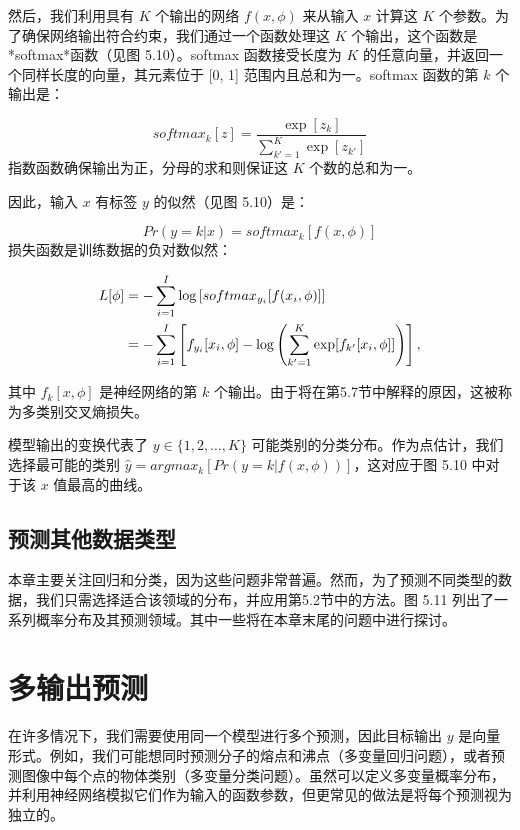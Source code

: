 然后，我们利用具有 \(K\) 个输出的网络 \(f(x, \phi)\) 来从输入 \(x\) 计算这 \(K\) 个参数。为了确保网络输出符合约束，我们通过一个函数处理这 \(K\) 个输出，这个函数是*softmax*函数（见图 5.10）。softmax 函数接受长度为 \(K\) 的任意向量，并返回一个同样长度的向量，其元素位于 [0, 1] 范围内且总和为一。softmax 函数的第 \(k\) 个输出是：

\begin{equation}
softmax_k[z] = \frac{\exp[z_k]}{\sum_{k'=1}^{K} \exp[z_{k'}]} 
\end{equation}
指数函数确保输出为正，分母的求和则保证这 \(K\) 个数的总和为一。

因此，输入 \(x\) 有标签 \(y\) 的似然（见图 5.10）是：

\begin{equation}
Pr(y = k|x) = softmax_k[f(x, \phi)] 
\end{equation}
损失函数是训练数据的负对数似然：

\begin{align}
L[\phi] &= -\sum_{i=1}^{I} \log \left[ softmax_{y_i} [f(x_i, \phi)] \right] \notag \\
&= -\sum_{i=1}^{I} \left[ f_{y_i}[x_i, \phi] - \log \left( \sum_{k'=1}^{K} \exp [f_{k'}[x_i, \phi]] \right) \right],
\end{align}


其中 \(f_k[x, \phi]\) 是神经网络的第 \(k\) 个输出。由于将在第5.7节中解释的原因，这被称为多类别交叉熵损失。

模型输出的变换代表了 \(y \in \{1, 2, \ldots, K\}\) 可能类别的分类分布。作为点估计，我们选择最可能的类别 \(\hat{y} = argmax_k[Pr(y = k|f(x, \phi))]\)，这对应于图 5.10 中对于该 \(x\) 值最高的曲线。

\subsection{预测其他数据类型}

本章主要关注回归和分类，因为这些问题非常普遍。然而，为了预测不同类型的数据，我们只需选择适合该领域的分布，并应用第5.2节中的方法。图 5.11 列出了一系列概率分布及其预测领域。其中一些将在本章末尾的问题中进行探讨。

\section{多输出预测}
在许多情况下，我们需要使用同一个模型进行多个预测，因此目标输出 \(y\) 是向量形式。例如，我们可能想同时预测分子的熔点和沸点（多变量回归问题），或者预测图像中每个点的物体类别（多变量分类问题）。虽然可以定义多变量概率分布，并利用神经网络模拟它们作为输入的函数参数，但更常见的做法是将每个预测视为独立的。

